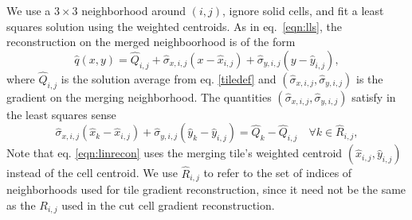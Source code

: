 \begin{enumerate}
We use a $3 \times 3$ neighborhood around $(i,j)$, ignore solid cells, and fit a least
squares solution using the weighted centroids.
As in eq.~\eqref{eqn:lls}, the reconstruction on the merged 
neighboorhood is of the form
\begin{equation}
\widehat{q}(x,y) = \widehat{Q}_{i, j} + \widehat{\sigma}_{x,i,j}(x - \widehat{x}_{i,j}) + \widehat{\sigma}_{y,i,j}(y - \widehat{y}_{i,j}),
\end{equation}
where $\widehat{Q}_{i, j}$ is the solution average from eq. \eqref{tiledef} and $(\widehat{\sigma}_{x,i,j},\widehat{\sigma}_{y,i,j})$ is 
the gradient on the merging neighborhood.
The quantities $(\widehat{\sigma}_{x,i,j},\widehat{\sigma}_{y,i,j})$ satisfy in the least squares sense
\begin{equation}\label{eqn:linrecon}
\widehat{\sigma}_{x,i,j}(\widehat{x}_{k} - \widehat{x}_{i,j}) +
\widehat{\sigma}_{y,i,j}(\widehat{y}_{k} - \widehat{y}_{i,j})=
\widehat{Q}_{k} - \widehat{Q}_{i, j} \quad \forall k \in \widehat{R}_{i,j},
\end{equation}
Note that eq. \eqref{eqn:linrecon} uses the merging tile's weighted centroid
$(\widehat{x}_{i,j},\widehat{y}_{i,j})$ instead of the cell centroid. 
We use 
$\widehat{R}_{i,j}$ to refer to the set of indices of neighborhoods 
used for tile gradient reconstruction,
since it need not be the same as the $R_{i,j}$ used in the cut cell gradient
reconstruction. 





\end{enumerate}
